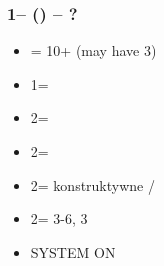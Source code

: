 \documentclass[12pt, a4paper]{report}
\begin{document}
{    \subsubsection*{1\spades -- (\dbl) -- ?}
    \begin{itemize}
        \item \rdbl = 10+ (may have 3\spades)
        \item 1\nt = \trsf{2\clubs}
        \item 2\clubs = \trsf{2\diams}
        \item 2\diams = \trsf{2\hearts}
        \item 2\hearts = \trsf{2\spades} konstruktywne / \gf
        \item 2\spades = 3-6, 3\spades
        \item \small{SYSTEM ON}
    \end{itemize}

}
\end{document}

